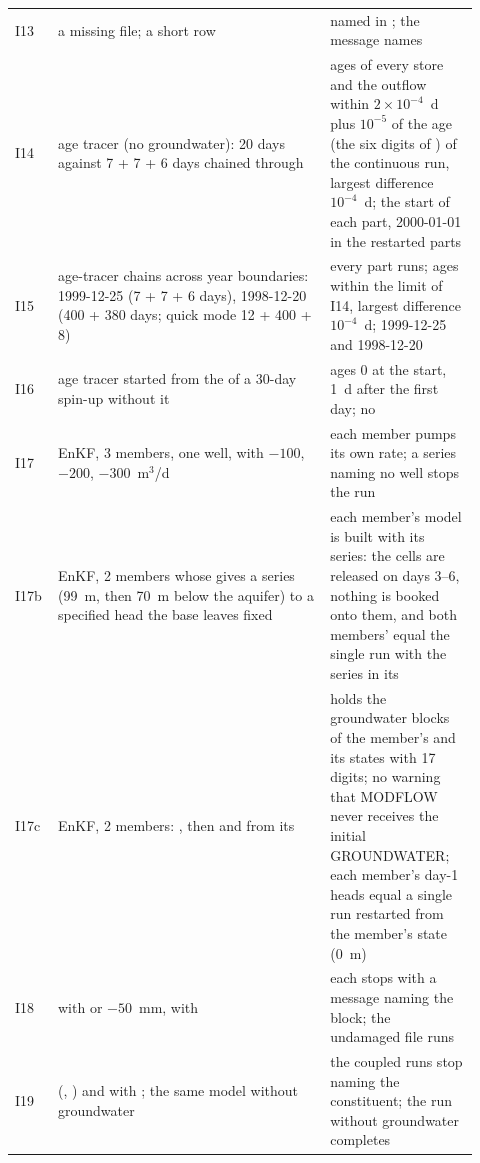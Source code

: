 \begin{longtable}{P{0.07\linewidth}P{0.55\linewidth}P{0.30\linewidth}}
I13 & a missing  file; a short  row & named in ; the message names \\
I14 & age tracer (no groundwater): 20 days against 7 + 7 + 6 days chained through  & ages of every store and the outflow within $2\times10^{-4}$~d plus $10^{-5}$ of the age (the six digits of ) of the continuous run, largest difference $10^{-4}$~d;  the start of each part,  2000-01-01 in the restarted parts\\
I15 & age-tracer chains across year boundaries: 1999-12-25 (7 + 7 + 6 days), 1998-12-20 (400 + 380 days; quick mode 12 + 400 + 8) & every part runs; ages within the limit of I14, largest difference $10^{-4}$~d;  1999-12-25 and 1998-12-20\\
I16 & age tracer started from the  of a 30-day spin-up without it & ages 0 at the start, 1~d after the first day; no \\
I17 & EnKF, 3 members, one well,  with $-100$, $-200$, $-300$~m$^3$/d & each member pumps its own rate; a series naming no well stops the run\\
I17b & EnKF, 2 members whose  gives a  series (99~m, then 70~m below the aquifer) to a specified head the base  leaves fixed & each member's model is built with its series: the cells are released on days 3--6, nothing is booked onto them, and both members'  equal the single run with the series in its \\
I17c & EnKF, 2 members: , then  and  from its  &  holds the groundwater blocks of the member's  and its states with 17 digits; no warning that MODFLOW never receives the initial GROUNDWATER; each member's day-1 heads equal a single run restarted from the member's state (0~m)\\
I18 &  with  or $-50$~mm,  with  & each stops with a message naming the block; the undamaged file runs\\
I19 &  (, ) and  with ; the same model without groundwater & the coupled runs stop naming the constituent; the run without groundwater completes\\

\end{longtable}
